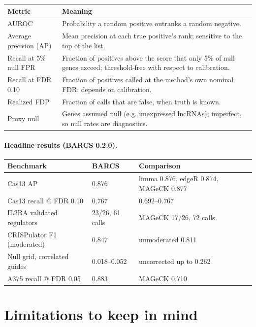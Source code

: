 \documentclass[11pt]{article}
\begin{document}
\begin{center}
\begin{tabular}{lp{}}
\toprule
Metric & Meaning\\
\midrule
AUROC & Probability a random positive outranks a random negative.\\
Average precision (AP) & Mean precision at each true positive's rank;
sensitive to the top of the list.\\
Recall at 5\% null FPR & Fraction of positives above the score that only
5\% of null genes exceed; threshold-free with respect to calibration.\\
Recall at FDR 0.10 & Fraction of positives called at the method's own
nominal FDR; depends on calibration.\\
Realized FDP & Fraction of calls that are false, when truth is known.\\
Proxy null & Genes assumed null (e.g. unexpressed lncRNAs); imperfect, so
null rates are diagnostics.\\
\bottomrule
\end{tabular}
\end{center}

\paragraph{Headline results (BARCS 0.2.0).}
\begin{center}
\begin{tabular}{lll}
\toprule
Benchmark & BARCS & Comparison\\
\midrule
Cas13 AP & 0.876 & limma 0.876, edgeR 0.874, MAGeCK 0.877\\
Cas13 recall @ FDR 0.10 & 0.767 & 0.692--0.767\\
IL2RA validated regulators & 23/26, 61 calls & MAGeCK 17/26, 72 calls\\
CRISPulator F1 (moderated) & 0.847 & unmoderated 0.811\\
Null grid, correlated guides & 0.018--0.052 & uncorrected up to 0.262\\
A375 recall @ FDR 0.05 & 0.883 & MAGeCK 0.710\\
\bottomrule
\end{tabular}
\end{center}

\section{Limitations to keep in mind}
\end{document}
